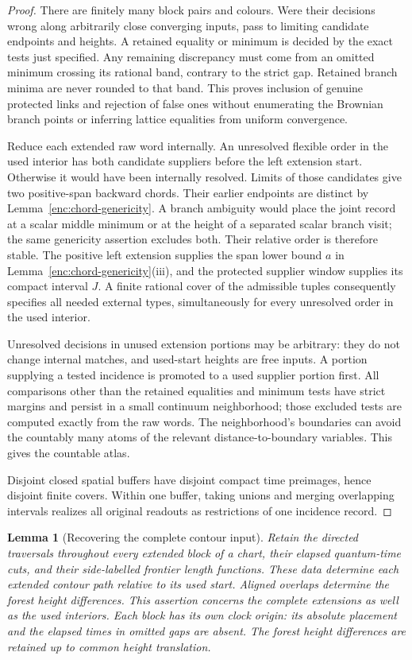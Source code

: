 \documentclass[11pt]{article}
\numberwithin{equation}{section}
\newtheorem{lemma}[theorem]{Lemma}
\theoremstyle{definition}
\theoremstyle{remark}
\newcommand{\1}{\mathbf 1}
\begin{document}
\begin{proof}
There are finitely many block pairs and colours.  Were their
decisions wrong along arbitrarily close converging inputs, pass
to limiting candidate endpoints and heights.  A retained equality
or minimum is decided by the exact tests just specified.  Any
remaining discrepancy must come from an omitted minimum crossing
its rational band, contrary to the strict gap.  Retained branch
minima are never rounded to that band.  This proves inclusion of
genuine protected links and rejection of false ones without
enumerating the Brownian branch points or inferring lattice
equalities from uniform convergence.

Reduce each extended raw word internally.  An unresolved flexible
order in the used interior has both candidate suppliers before the
left extension start.  Otherwise it would have been internally
resolved.  Limits of those candidates give two positive-span backward
chords.  Their earlier endpoints are distinct by
Lemma~\ref{enc:chord-genericity}.  A branch ambiguity would place the joint
record at a scalar middle minimum or at the height of a separated
scalar branch visit; the same genericity assertion excludes both.
Their relative order is therefore stable.  The positive left
extension supplies the span lower bound $a$ in
Lemma~\ref{enc:chord-genericity}(iii), and the protected supplier
window supplies its compact interval $J$.  A finite rational cover
of the admissible tuples consequently specifies all needed external
types, simultaneously for every unresolved order in the used interior.

Unresolved decisions in unused extension portions may be arbitrary:
they do not change internal matches, and used-start heights are free
inputs.  A portion supplying a tested incidence is promoted to a used
supplier portion first.  All comparisons other than the retained
equalities and minimum tests have strict margins and persist in a
small continuum neighborhood; those excluded tests are computed
exactly from the raw words.  The neighborhood's boundaries can avoid the countably many atoms
of the relevant distance-to-boundary variables.  This gives the
countable atlas.

Disjoint closed spatial buffers have disjoint compact time preimages,
hence disjoint finite covers.  Within one buffer, taking unions and
merging overlapping intervals realizes all original readouts as
restrictions of one incidence record.
\end{proof}

\begin{lemma}[Recovering the complete contour input]
\label{ker:input-recovery}
Retain the directed traversals throughout every extended block of a
chart, their elapsed quantum-time cuts, and their side-labelled
frontier length functions.  These data determine each extended
contour path relative to its used start.  Aligned overlaps determine
the forest height differences.  This assertion concerns the complete
extensions as well as the used interiors.  Each block has its own
clock origin: its absolute placement and the elapsed times in omitted
gaps are absent.  The forest height differences are retained up to
common height translation.
\end{lemma}
\end{document}

